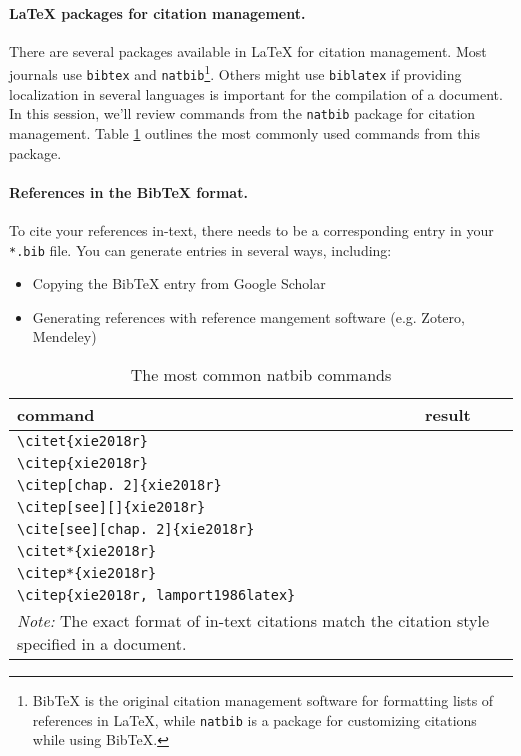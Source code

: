 \documentclass[11pt]{article}
\begin{document}
\paragraph{{\LaTeX} packages for citation management.} There are several packages available in {\LaTeX} for citation management. Most journals use \verb|bibtex| and \verb|natbib|\footnote{BibTeX is the original citation management software for formatting lists of references in {\LaTeX}, while \texttt{natbib} is a package for customizing citations while using BibTeX.}. Others might use \verb|biblatex| if providing localization in several languages is important for the compilation of a document. In this session, we'll review commands from the \texttt{natbib} package for citation management. Table \ref{tab:natbib} outlines the most commonly used commands from this package.

\paragraph{References in the BibTeX format.} To cite your references in-text, there needs to be a corresponding entry in your \texttt{*.bib} file. You can generate entries in several ways, including:
\begin{itemize}[nolistsep,noitemsep]
    \item Copying the BibTeX entry from Google Scholar
    \item Generating references with reference mangement software (e.g. Zotero, Mendeley)
\end{itemize}

\begin{table}[htbp]
  \centering
  \caption{The most common natbib commands}
    \begin{tabular}{ll}
    \toprule
    command & result \\
    \midrule
    \verb|\citet{xie2018r}| & \citet{xie2018r} \\
    \verb|\citep{xie2018r}| & \citep{xie2018r} \\
    \verb|\citep[chap. 2]{xie2018r}| & \citep[chap. 2]{xie2018r} \\
    \verb|\citep[see][]{xie2018r}| & \citep[see][]{xie2018r} \\
    \verb|\cite[see][chap. 2]{xie2018r}| & \cite[see][chap. 2]{xie2018r} \\
    \verb|\citet*{xie2018r}| & \citet*{xie2018r} \\
    \verb|\citep*{xie2018r}| & \citep*{xie2018r} \\
    \verb|\citep{xie2018r, lamport1986latex}| & \citep*{xie2018r, lamport1986latex} \\
    \bottomrule
    \multicolumn{2}{l}{\textit{Note:} The exact format of in-text citations match the citation style specified in a document.}
    \end{tabular}%
  \label{tab:natbib}%
\end{table}%
\end{document}
